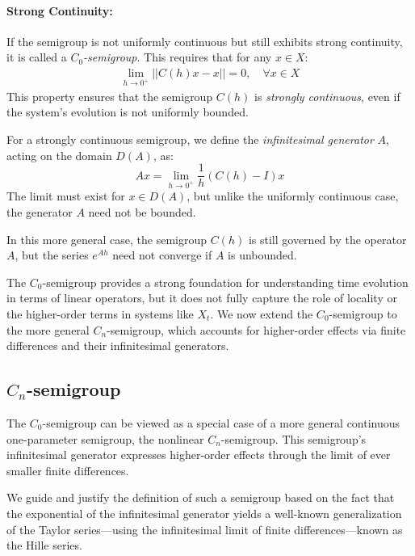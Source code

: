 \documentclass{article}
\begin{document}
\paragraph{Strong Continuity:}
If the semigroup is not uniformly continuous but still exhibits strong continuity, it is called a \textit{$C_0$-semigroup}. This requires that for any \( x \in X \):
\begin{align}
    \lim_{h \to 0^+} || C(h) x - x || = 0, \quad \forall x \in X \label{eq:strong_continuity}
\end{align}
This property ensures that the semigroup \( C(h) \) is \textit{strongly continuous}, even if the system's evolution is not uniformly bounded.

For a strongly continuous semigroup, we define the \textit{infinitesimal generator} \( A \), acting on the domain \( D(A) \), as:
\begin{equation}
    Ax =  \lim_{h\rightarrow0^+} \frac{1}{h} (C(h) - I)x \label{eq:continuity}
\end{equation}
The limit must exist for \( x \in D(A) \), but unlike the uniformly continuous case, the generator \( A \) need not be bounded.

In this more general case, the semigroup \( C(h) \) is still governed by the operator \( A \), but the series \( e^{Ah} \) need not converge if \( A \) is unbounded.

The $C_0$-semigroup provides a strong foundation for understanding time evolution in terms of linear operators, but it does not fully capture the role of locality or the higher-order terms in systems like \( X_t \). We now extend the $C_0$-semigroup to the more general $C_n$-semigroup, which accounts for higher-order effects via finite differences and their infinitesimal generators.

\subsection{$C_n$-semigroup}

The $C_0$-semigroup can be viewed as a special case of a more general continuous one-parameter semigroup, the nonlinear $C_n$-semigroup. This semigroup's infinitesimal generator expresses higher-order effects through the limit of ever smaller finite differences.

We guide and justify the definition of such a semigroup based on the fact that the exponential of the infinitesimal generator yields a well-known generalization of the Taylor series—using the infinitesimal limit of finite differences—known as the Hille series.
\end{document}
